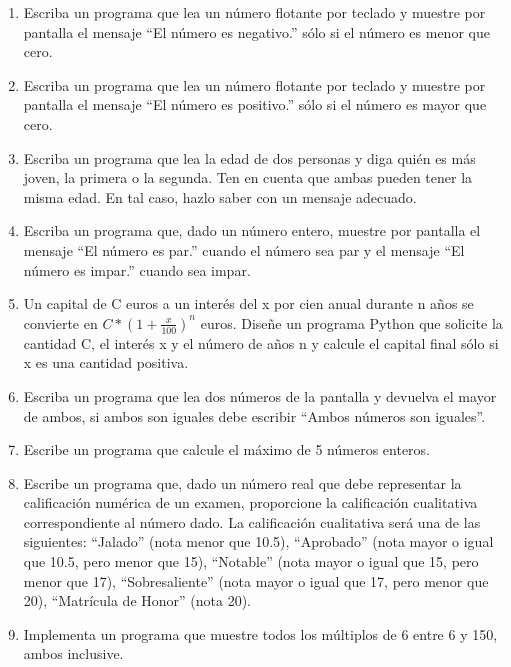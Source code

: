 \begin{enumerate}
\item Escriba un programa que lea un número flotante por teclado y muestre por pantalla el mensaje ``El número es negativo.'' sólo si el número es menor que cero.

\item Escriba un programa que lea un número flotante por teclado y muestre por pantalla el mensaje ``El número es positivo.'' sólo si el número es mayor que cero.

\item Escriba un programa que lea la edad de dos personas y diga quién es más joven, la primera o la segunda. Ten en cuenta que ambas pueden tener la misma edad. En tal caso, hazlo saber con un mensaje adecuado.

\item Escriba un programa que, dado un número entero, muestre por pantalla el mensaje ``El número es par.'' cuando el número sea par y el mensaje ``El número es impar.'' cuando sea impar.

\item Un capital de C euros a un interés del x por cien anual durante n años se convierte en $C*(1 + \frac{x}{100})^n$ euros. Diseñe un programa Python que solicite la cantidad C, el interés x y el número de años n y calcule el capital final sólo si x es una cantidad positiva.

\item Escriba un programa que lea dos números de la pantalla y devuelva el mayor de ambos, si ambos son iguales debe escribir ``Ambos números son iguales''.

\item Escribe un programa que calcule el máximo de 5 números enteros.

\item Escribe un programa que, dado un número real que debe representar la calificación numérica de un examen, proporcione la calificación cualitativa correspondiente al número dado. La calificación cualitativa será una de las siguientes: ``Jalado'' (nota menor que 10.5), ``Aprobado'' (nota mayor o igual que 10.5, pero menor que 15), ``Notable'' (nota mayor o igual que 15, pero menor que 17), ``Sobresaliente'' (nota mayor o igual que 17, pero menor que 20), ``Matrícula de Honor'' (nota 20).

\item Implementa un programa que muestre todos los múltiplos de 6 entre 6 y 150, ambos inclusive.


\end{enumerate}

